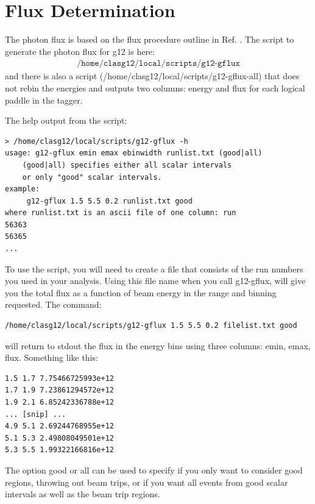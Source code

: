 \section{\label{sec:flux}Flux Determination}

The photon flux is based on the flux procedure outline in Ref. \cite{clas.flux}. The script to generate the photon flux for g12 is here:
\begin{align}
    \texttt{/home/clasg12/local/scripts/g12-gflux} \nonumber
\end{align} and there is also a script (/home/clasg12/local/scripts/g12-gflux-all) that does not rebin the energies and outputs two columns: energy and flux for each logical paddle in the tagger.

The help output from the script:
\begin{verbatim}
> /home/clasg12/local/scripts/g12-gflux -h
usage: g12-gflux emin emax ebinwidth runlist.txt (good|all)
    (good|all) specifies either all scalar intervals
    or only "good" scalar intervals.
example:
     g12-gflux 1.5 5.5 0.2 runlist.txt good
where runlist.txt is an ascii file of one column: run
56363
56365
...
\end{verbatim}

To use the script, you will need to create a file that consists of the run numbers you used in your analysis. Using this file name when you call g12-gflux, will give you the total flux as a function of beam energy in the range and binning requested. The command:
\begin{verbatim}
/home/clasg12/local/scripts/g12-gflux 1.5 5.5 0.2 filelist.txt good
\end{verbatim}

will return to stdout the flux in the energy bins using three columns: emin, emax, flux. Something like this:
\begin{verbatim}
1.5 1.7 7.75466725993e+12
1.7 1.9 7.23861294572e+12
1.9 2.1 6.85242336788e+12
... [snip] ...
4.9 5.1 2.69244768955e+12
5.1 5.3 2.49808049501e+12
5.3 5.5 1.99322166816e+12
\end{verbatim}

The option good or all can be used to specify if you only want to consider good regions, throwing out beam trips, or if you want all events from good scalar intervals as well as the beam trip regions.

